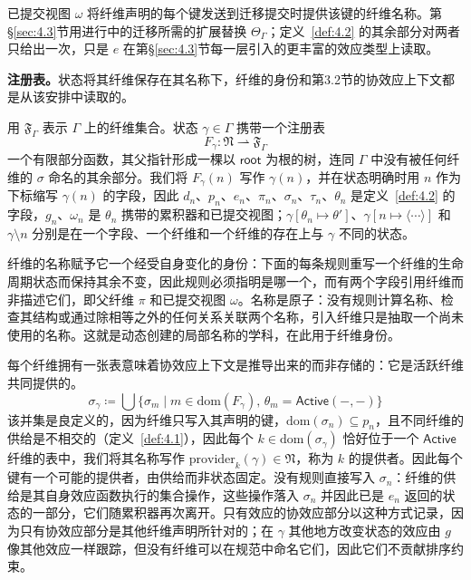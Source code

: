 已提交视图 $\omega$ 将纤维声明的每个键发送到迁移提交时提供该键的纤维名称。第\S\ref{sec:4.3}节用进行中的迁移所需的扩展替换 $\Theta_\Gamma$；定义~\ref{def:4.2} 的其余部分对两者只给出一次，只是 $e$ 在第\S\ref{sec:4.3}节每一层引入的更丰富的效应类型上读取。

\textbf{注册表。}状态将其纤维保存在其名称下，纤维的身份和第3.2节的协效应上下文都是从该安排中读取的。

\begin{definition}\label{def:4.3}
用 $\mathfrak{F}_\Gamma$ 表示 $\Gamma$ 上的纤维集合。状态 $\gamma \in \Gamma$ 携带一个注册表
\begin{equation}\label{eq:4.3}
F_\gamma: \mathfrak{N} \rightharpoonup \mathfrak{F}_\Gamma
\end{equation}
一个有限部分函数，其父指针形成一棵以 $\mathsf{root}$ 为根的树，连同 $\Gamma$ 中没有被任何纤维的 $\sigma$ 命名的其余部分。我们将 $F_\gamma(n)$ 写作 $\gamma(n)$，并在状态明确时用 $n$ 作为下标缩写 $\gamma(n)$ 的字段，因此 $d_n$、$p_n$、$e_n$、$\pi_n$、$\sigma_n$、$\tau_n$、$\theta_n$ 是定义~\ref{def:4.2} 的字段，$g_n$、$\omega_n$ 是 $\theta_n$ 携带的累积器和已提交视图；$\gamma[\theta_n \mapsto \theta']$、$\gamma[n \mapsto \langle \cdots\rangle]$ 和 $\gamma \setminus n$ 分别是在一个字段、一个纤维和一个纤维的存在上与 $\gamma$ 不同的状态。
\end{definition}

纤维的名称赋予它一个经受自身变化的身份：下面的每条规则重写一个纤维的生命周期状态而保持其余不变，因此规则必须指明是哪一个，而有两个字段引用纤维而非描述它们，即父纤维 $\pi$ 和已提交视图 $\omega$。名称是原子：没有规则计算名称、检查其结构或通过除相等之外的任何关系关联两个名称，引入纤维只是抽取一个尚未使用的名称。这就是动态创建的局部名称的学科\cite{ref39}，在此用于纤维身份。

每个纤维拥有一张表意味着协效应上下文是推导出来的而非存储的：它是活跃纤维共同提供的。
\begin{equation}\label{eq:4.4}
\sigma_\gamma \coloneqq \bigcup \{\sigma_m \mid m \in \mathrm{dom}(F_\gamma),\, \theta_m = \mathsf{Active}(-, -)\}
\end{equation}
该并集是良定义的，因为纤维只写入其声明的键，$\mathrm{dom}(\sigma_n) \subseteq p_n$，且不同纤维的供给是不相交的（定义~\ref{def:4.1}），因此每个 $k \in \mathrm{dom}(\sigma_\gamma)$ 恰好位于一个 $\mathsf{Active}$ 纤维的表中，我们将其名称写作 $\mathrm{provider}_k(\gamma) \in \mathfrak{N}$，称为 $k$ 的提供者。因此每个键有一个可能的提供者，由供给而非状态固定。没有规则直接写入 $\sigma_n$：纤维的供给是其自身效应函数执行的集合操作，这些操作落入 $\sigma_n$ 并因此已是 $e_n$ 返回的状态的一部分，它们随累积器再次离开。只有效应的协效应部分以这种方式记录，因为只有协效应部分是其他纤维声明所针对的；在 $\gamma$ 其他地方改变状态的效应由 $g$ 像其他效应一样跟踪，但没有纤维可以在规范中命名它们，因此它们不贡献排序约束。

